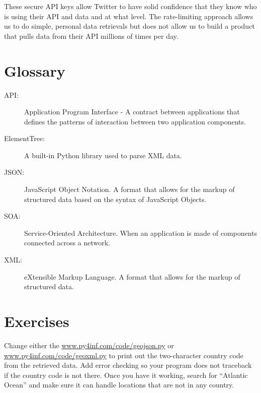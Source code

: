 These secure API keys allow Twitter to have solid confidence that they 
know who is using their API and data and at what level.   The 
rate-limiting approach allows us to do simple, personal data retrievals but
does not allow us to build a product that pulls data from their API 
millions of times per day.

\section{Glossary}

\begin{description}

\item[API:] Application Program Interface - A contract between
applications that defines the patterns of interaction between 
two application components.

\item[ElementTree:] A built-in Python library used to parse XML data.

\item[JSON:] JavaScript Object Notation. A format that allows for 
the markup of structured data based on the syntax of JavaScript
Objects.

\item[SOA:] Service-Oriented Architecture. When an application is 
made of components connected across a network.

\item[XML:] eXtensible Markup Language. A format that allows for 
the markup of structured data.

\end{description}

\section{Exercises}

\begin{ex}
Change either the 
\url{www.py4inf.com/code/geojson.py} or
\url{www.py4inf.com/code/geoxml.py} to print out the 
two-character country code from the retrieved data.
Add error checking so your program does not traceback
if the country code is not there.  Once you have it 
working, search for ``Atlantic Ocean'' and make sure
it can handle locations that are not in any country.
\end{ex}

